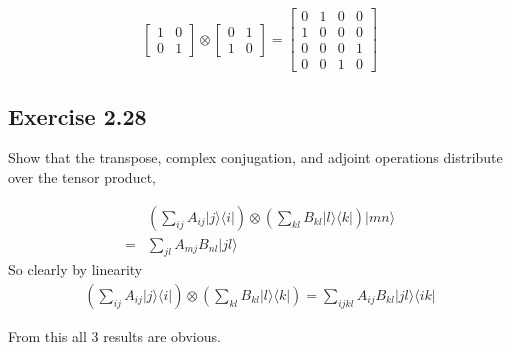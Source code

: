 \documentclass[]{article}
\newcommand{\bra}[1]{\langle #1 |}
\newcommand{\ket}[1]{| #1 \rangle}
\begin{document}
\[
\left[\begin{matrix}
1 & 0 \\
0 & 1
\end{matrix}\right]
\otimes
\left[\begin{matrix}
0 & 1 \\
1 & 0
\end{matrix}\right]
=
\left[\begin{matrix}
0 & 1 & 0 & 0 \\
1 & 0 & 0 & 0 \\
0 & 0 & 0 & 1 \\
0 & 0 & 1 & 0
\end{matrix}\right]
\]

\subsection{Exercise 2.28}

Show that the transpose, complex conjugation, and adjoint operations distribute over the tensor product,

\begin{align*}
&\left(\sum_{ij}A_{ij}\ket{j}\bra{i}\right)
\otimes
\left(\sum_{kl}B_{kl}\ket{l}\bra{k}\right)\ket{mn}
\\= &\sum_{jl}A_{mj}B_{nl} \ket{jl}
\end{align*}
So clearly by linearity
\begin{align*}
\left(\sum_{ij}A_{ij}\ket{j}\bra{i}\right)
\otimes
\left(\sum_{kl}B_{kl}\ket{l}\bra{k}\right)
=
\sum_{ijkl}A_{ij}B_{kl} \ket{jl}\bra{ik}
\end{align*}

From this all 3 results are obvious.
\end{document}
